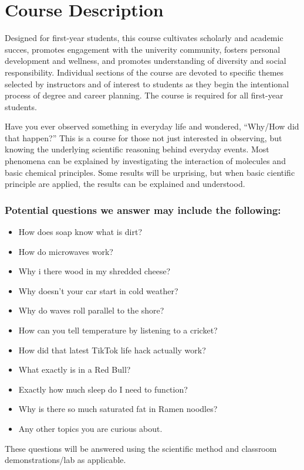 \documentclass[11pt,letterpaper]{article}
\begin{document}
\section{Course Description}
Designed for first-year students, this course cultivates scholarly and academic
succes, promotes engagement with the univerity community, fosters personal
development and wellness, and promotes understanding of diversity and social
responsibility. Individual sections of the course are devoted to specific themes
selected by instructors and of interest to students as they begin the
intentional process of degree and career planning. The course is required for
all first-year students.

Have you ever observed something in everyday life and wondered, ``Why/How did
that happen?'' This is a course for those not just interested in observing, but
knowing the underlying scientific reasoning behind everyday events. Most
phenomena can be explained by investigating the interaction of molecules and
basic chemical principles. Some results will be urprising, but when basic
cientific principle are applied, the results can be explained and understood.

\subsubsection{Potential questions we answer may include the following:}
\begin{itemize}
	\item How does soap know what is dirt?
	\item How do microwaves work?
	\item Why i there wood in my shredded cheese?
	\item Why doesn't your car start in cold weather?
	\item Why do waves roll parallel to the shore?
	\item How can you tell temperature by listening to a cricket?
	\item How did that latest TikTok life hack actually work?
	\item What exactly is in a Red Bull?
	\item Exactly how much sleep do I need to function?
	\item Why is there so much saturated fat in Ramen noodles?
	\item Any other topics you are curious about.
\end{itemize}

These questions will be answered using the scientific method and classroom
demonstrations/lab as applicable.
\end{document}
